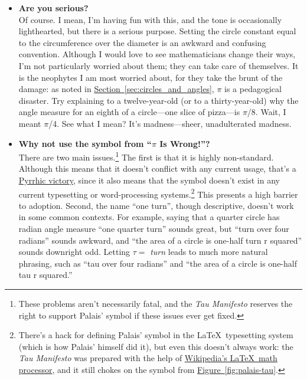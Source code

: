 \documentclass{article}
\begin{document}
\begin{itemize}

  \item \textbf{Are you serious?} \\ Of course. I mean, I'm having fun with this, and the tone is occasionally lighthearted, but there is a serious purpose. Setting the circle constant equal to the circumference over the diameter is an awkward and confusing convention. Although I would love to see mathematicians change their ways, I'm not particularly worried about them; they can take care of themselves. It is the neophytes I am most worried about, for they take the brunt of the damage: as noted in \hyperref[sec:circles_and_angles]{Section~}\ref{sec:circles_and_angles}, $\pi$ is a pedagogical disaster. Try explaining to a twelve-year-old (or to a thirty-year-old) why the angle measure for an eighth of a circle---one slice of pizza---is $\pi$/8. Wait, I meant $\pi$/4. See what I mean? It's madness---sheer, unadulterated madness.

  \item \textbf{Why not use the symbol from ``$\pi$ Is Wrong!''?} \\ There are two main issues.\footnote{These problems aren't necessarily fatal, and the \emph{Tau Manifesto} reserves the right to support Palais' symbol if these issues ever get fixed.} The first is that it is highly non-standard. Although this means that it doesn't conflict with any current usage, that's a \href{http://en.wikipedia.org/wiki/Pyrrhic_victory}{Pyrrhic victory}, since it also means that the symbol doesn't exist in any current typesetting or word-processing systems.\footnote{There's a hack for defining Palais' symbol in the \LaTeX\ typesetting system (which is how Palais' himself did it), but even this doesn't always work: the \emph{Tau Manifesto} was prepared with the help of \href{http://en.wikipedia.org/wiki/Texvc}{Wikipedia's \LaTeX\ math processor}, and it still chokes on the symbol from \hyperref[fig:palais-tau]{Figure~}\ref{fig:palais-tau}.} This presents a high barrier to adoption. Second, the name ``one turn'', though descriptive, doesn't work in some common contexts. For example, saying that a quarter circle has radian angle measure ``one quarter turn'' sounds great, but ``turn over four radians'' sounds awkward, and ``the area of a circle is one-half turn r squared'' sounds downright odd. Letting $\tau = $ \emph{turn} leads to much more natural phrasing, such as ``tau over four radians'' and ``the area of a circle is one-half tau r squared.''


\end{itemize}
\end{document}
